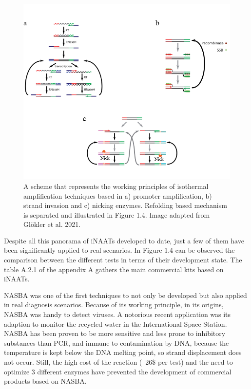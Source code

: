 \begin{figure}[b]
    \centering
    \includegraphics[width=1\textwidth]{data/iNAATs.png}
    \caption[Representation of isothermal amplification techniques]{A scheme that represents the working principles of isothermal amplification techniques based in a) promoter amplification, b) strand invasion and c) nicking enzymes. Refolding based mechanism is separated and illustrated in Figure 1.4. Image adapted from Glökler et al. 2021\cite{glokler_isothermal_2021}.}
    \label{fig:commercial iNAATs}
\end{figure}

Despite all this panorama of iNAATs developed to date, just a few of them have been significantly applied to real scenarios. In Figure 1.4 can be observed the comparison between the different tests in terms of their development state. The table A.2.1 of the appendix A gathers the main commercial kits based on iNAATs.

NASBA was one of the first techniques to not only be developed but also applied in real diagnosis scenarios. Because of its working principle, in its origins, NASBA was handy to detect viruses\cite{rutjes_real-time_2006}. A notorious recent application was its adaption to monitor the recycled water in the International Space Station\cite{bechy-loizeau_assessment_2015}. NASBA has been proven to be more sensitive and less prone to inhibitory substances than PCR\cite{rutjes_real-time_2006}, and immune to contamination by DNA, because the temperature is kept below the DNA melting point, so strand displacement does not occur\cite{simpkins_rna_2000}. Still, the high cost of the reaction (~26\$ per test\cite{oliveira_isothermal_2021}) and the need to optimize 3 different enzymes have prevented the development of commercial products based on NASBA.

